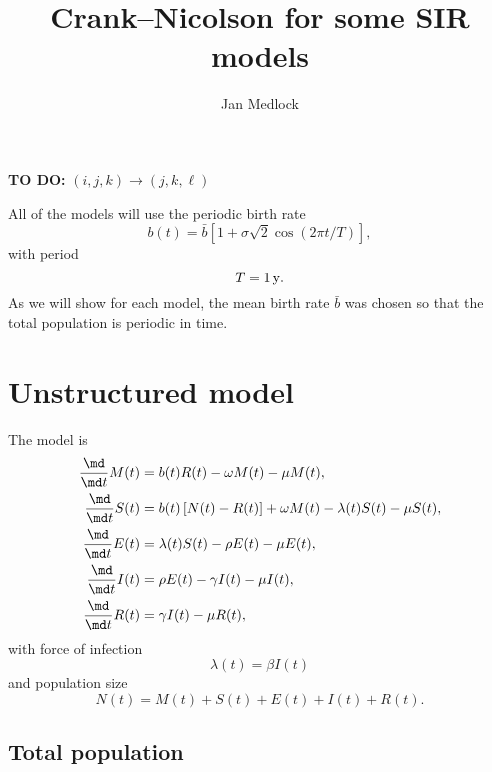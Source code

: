 \documentclass{jpmarticle}
\title{Crank--Nicolson for some SIR models}
\author{Jan Medlock}
\begin{document}
\maketitle


\textbf{TO DO:} $(i, j, k) \to (j, k, \ell)$


All of the models will use the periodic birth rate
\begin{equation}
  b(t) = \bar{b} \left[
    1 + \sigma \sqrt{2} \cos\left(2 \pi t / T\right)
  \right],
\end{equation}
with period
\begin{equation}
  T = \unit[1]{y}.
\end{equation}
As we will show for each model, the mean birth rate $\bar{b}$
was chosen so that the total population is periodic in time.


\section{Unstructured model}

The model is
\begin{equation}
  \label{model_unstructured}
  \begin{split}
    \frac{\md}{\md t} M(t) &=
    b(t) R(t) - \omega M(t) - \mu M(t),
    \\
    \frac{\md}{\md t} S(t) &=
    b(t) \left[N(t) - R(t)\right] + \omega M(t) - \lambda(t) S(t) - \mu S(t),
    \\
    \frac{\md}{\md t} E(t) &=
    \lambda(t) S(t) - \rho E(t) - \mu E(t),
    \\
    \frac{\md}{\md t} I(t) &=
    \rho E(t) - \gamma I(t) - \mu I(t),
    \\
    \frac{\md}{\md t} R(t) &=
    \gamma I(t) - \mu R(t),
  \end{split}
\end{equation}
with force of infection
\begin{equation}
  \lambda(t) = \beta I(t)
\end{equation}
and population size
\begin{equation}
  N(t) = M(t) + S(t) + E(t) + I(t) + R(t).
\end{equation}


\subsection{Total population}
\end{document}
